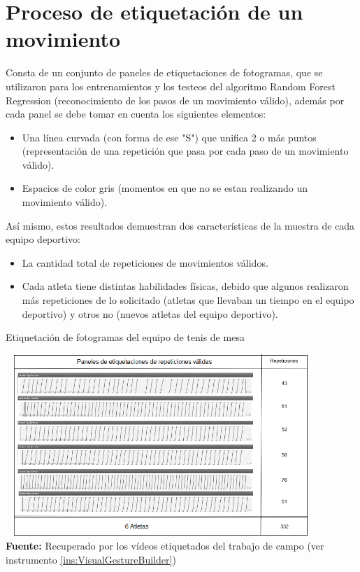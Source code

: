 \section{Proceso de etiquetaci\'on de un movimiento}
Consta de un conjunto de paneles de etiquetaciones de fotogramas, que se utilizaron para los entrenamientos y los testeos del algoritmo Random Forest Regression (reconocimiento de los pasos de un movimiento v\'alido), adem\'as por cada panel se debe tomar en cuenta los  siguientes elementos:
\begin{itemize}
\item Una l\'inea curvada (con forma de ese "S") que unifica 2 o m\'as puntos (representaci\'on de una repetici\'on que pasa por cada paso de un  movimiento v\'alido).
\item Espacios de color gris (momentos en que no se estan realizando un movimiento v\'alido).
\end{itemize}
As\'i mismo, estos resultados demuestran dos caracter\'isticas de la muestra de cada equipo deportivo:
\begin{itemize}
\item  La cantidad total de repeticiones de movimientos v\'alidos.
\item Cada atleta tiene distintas habilidades f\'isicas, debido que algunos realizaron m\'as repeticiones de lo solicitado (atletas que llevaban un tiempo en el equipo deportivo) y otros no (nuevos atletas del equipo deportivo).
\end{itemize}
\begin{table}[H]
	\caption{Etiquetaci\'on de fotogramas del equipo de tenis de mesa}
	\label{fig:etiquetaTenis}
	\centering
	\includegraphics[width=445px,height=260px]{graphics/resultados/GraSegTenisDeMesa.PNG} \\
	\textbf{Fuente:} Recuperado por los v\'ideos etiquetados del trabajo de campo (ver instrumento \ref{ins:VisualGestureBuilder})
\end{table}
